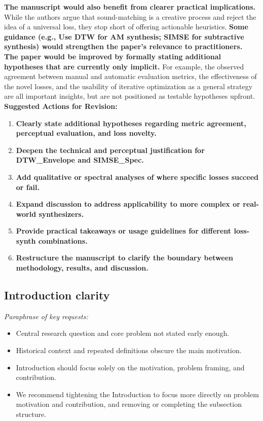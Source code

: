 \documentclass[11pt]{article}
\begin{document}
\textbf{The manuscript would also benefit from clearer practical implications.} While the authors argue that sound-matching is a creative process and reject the idea of a universal loss, they stop short of offering actionable heuristics. \textbf{Some guidance (e.g., Use DTW for AM synthesis; SIMSE for subtractive synthesis) would strengthen the paper’s relevance to practitioners.} \\
\textbf{The paper would be improved by formally stating additional hypotheses that are currently only implicit.} For example, the observed agreement between manual and automatic evaluation metrics, the effectiveness of the novel losses, and the usability of iterative optimization as a general strategy are all important insights, but are not positioned as testable hypotheses upfront. \\
\textbf{Suggested Actions for Revision:}
\begin{enumerate}
  \item \textbf{Clearly state additional hypotheses regarding metric agreement, perceptual evaluation, and loss novelty.}
  \item \textbf{Deepen the technical and perceptual justification for DTW\_Envelope and SIMSE\_Spec.}
  \item \textbf{Add qualitative or spectral analyses of where specific losses succeed or fail.}
  \item \textbf{Expand discussion to address applicability to more complex or real-world synthesizers.}
  \item \textbf{Provide practical takeaways or usage guidelines for different loss-synth combinations.}
  \item \textbf{Restructure the manuscript to clarify the boundary between methodology, results, and discussion.}
\end{enumerate}

\subsection*{Introduction clarity}
\noindent\textit{Paraphrase of key requests:}
\begin{itemize}
  \item Central research question and core problem not stated early enough.
  \item Historical context and repeated definitions obscure the main motivation.
  \item Introduction should focus solely on the motivation, problem framing, and contribution.
  \item We recommend tightening the Introduction to focus more directly on problem motivation and contribution, and removing or completing the subsection structure.
\end{itemize}
\end{document}

